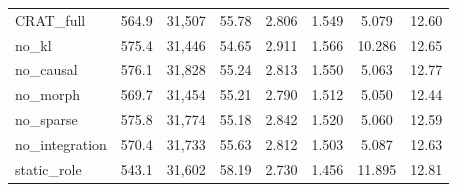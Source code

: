 \begin{tabular}{lccccccc}
CRAT\_full & 564.9 & 31,507 & 55.78 & 2.806 & 1.549 & 5.079 & 12.60 \\
no\_kl & 575.4 & 31,446 & 54.65 & 2.911 & 1.566 & 10.286 & 12.65 \\
no\_causal & 576.1 & 31,828 & 55.24 & 2.813 & 1.550 & 5.063 & 12.77 \\
no\_morph & 569.7 & 31,454 & 55.21 & 2.790 & 1.512 & 5.050 & 12.44 \\
no\_sparse & 575.8 & 31,774 & 55.18 & 2.842 & 1.520 & 5.060 & 12.59 \\
no\_integration & 570.4 & 31,733 & 55.63 & 2.812 & 1.503 & 5.087 & 12.63 \\
static\_role & 543.1 & 31,602 & 58.19 & 2.730 & 1.456 & 11.895 & 12.81 \\
\bottomrule
\end{tabular}
\endgroup
